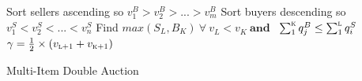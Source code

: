 \begin{algorithm}%
\DontPrintSemicolon
\SetAlgoLined
\BlankLine
{Sort sellers ascending so $v^B_{1}>v^B_{2}>...>v^B_{m}$}
    \BlankLine
 {Sort buyers descending so $v^S_{1}<v^S_{2}<...<v^S_{n}$}
    \BlankLine
{Find $max(S_L, B_K) \ \forall \ v^{}_L<v^{}_K\ \textbf{and}$ \ {$\sum_{1}^\textsc{k} q_{j}^B \leq \sum_{1}^\textsc{l} q_{i}^S$}}{
    \BlankLine
    {$\gamma = {\frac{1}{2}}\times({v_\textsc{l+1}+v_\textsc{k+1}})$}
    }
    \BlankLine
\caption{Multi-Item Double Auction}
\label{alg:MC_algorithm}
\end{algorithm}

